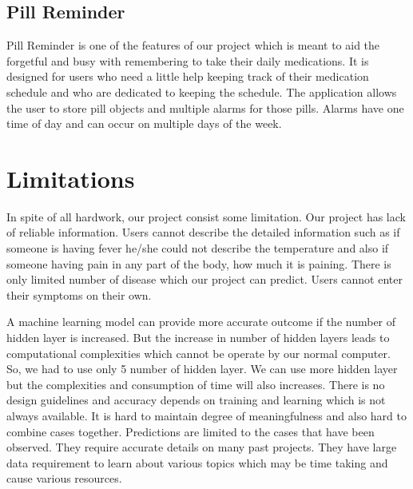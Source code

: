 {\subsection{Pill Reminder}
Pill Reminder is one of the features of our project which is meant to aid the forgetful and busy with remembering to take their daily medications. It is designed for users who need a little help keeping track of their medication schedule and who are dedicated to keeping the schedule. The application allows the user to store pill objects and multiple alarms for those pills. Alarms have one time of day and can occur on multiple days of the week.





\section{Limitations}
In spite of all hardwork, our project consist some limitation. Our project has lack of reliable information. Users cannot describe the detailed information such as if someone is having fever he/she could not describe the temperature and also if someone having pain in any part of the body, how much it is paining. There is only limited number of disease which our project can predict. Users cannot enter their symptoms on their own.\par 
A machine learning model can provide more accurate outcome if the number of hidden layer is increased. But the increase in number of hidden layers leads to computational complexities which cannot be operate by our normal computer. So, we had to use only 5 number of hidden layer. We can use more hidden layer but the complexities and consumption of time will also increases. There is no design guidelines and accuracy depends on training and learning which is not always available. It is hard to maintain degree of meaningfulness and also hard to combine cases together. Predictions are limited to the cases that have been observed. They require accurate details on many past projects. They have large data requirement to learn about various topics which may be time taking and cause various resources.\par 
}
